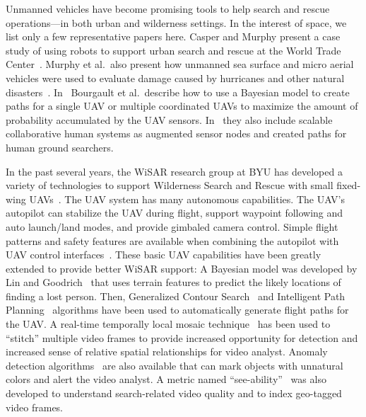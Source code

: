 Unmanned vehicles have become promising tools to help search and rescue operations---in both urban and wilderness settings. In the interest of space, we list only a few representative papers here. Casper and Murphy present a case study of using robots to support urban search and rescue at the World Trade Center~\cite{Casper2003WTO}. Murphy et al.\ also present how unmanned sea surface and micro aerial vehicles were used to evaluate damage caused by hurricanes and other natural disasters~\cite{Murphy2008Cooperative}. In~\cite{Bourgault2003OptimalSearchs, Bourgault2004Coordinated} Bourgault et al.\ describe how to use a Bayesian model to create paths for a single UAV or multiple coordinated UAVs to maximize the amount of probability accumulated by the UAV sensors. In~\cite{Bourgault2008AugmentedNodes} they also include scalable collaborative human systems as augmented sensor nodes and created paths for human ground searchers.

In the past several years, the WiSAR research group at BYU has developed a variety of technologies to support Wilderness Search and Rescue with small fixed-wing UAVs~\cite{Beard2005Autonomous, Goodrich2008Supporting, Goodrich2009Towards, Lin2010Supporting}. The UAV system has many autonomous capabilities. The UAV's autopilot can stabilize the UAV during flight, support waypoint following and auto launch/land modes, and provide gimbaled camera control. Simple flight patterns and safety features are available when combining the autopilot with UAV control interfaces~\cite{Beard2005Autonomous, Lin2010Supporting}. These basic UAV capabilities have been greatly extended to provide better WiSAR support: A Bayesian model was developed by Lin and Goodrich~\cite{Lin2010Bayesian} that uses terrain features to predict the likely locations of finding a lost person. Then, Generalized Contour Search~\cite{Goodrich2008Supporting} and Intelligent Path Planning~\cite{Lin2009UAV} algorithms have been used to automatically generate flight paths for the UAV. A real-time temporally local mosaic technique~\cite{Morse2008Application} has been used to ``stitch'' multiple video frames to provide increased opportunity for detection and increased sense of relative spatial relationships for video analyst. Anomaly detection algorithms~\cite{Thornton2011Unusual} are also available that can mark objects with unnatural colors and alert the video analyst. 
A metric named ``see-ability''~\cite{Morse2010UAV} was also developed to understand search-related video quality and to index geo-tagged video frames. 

